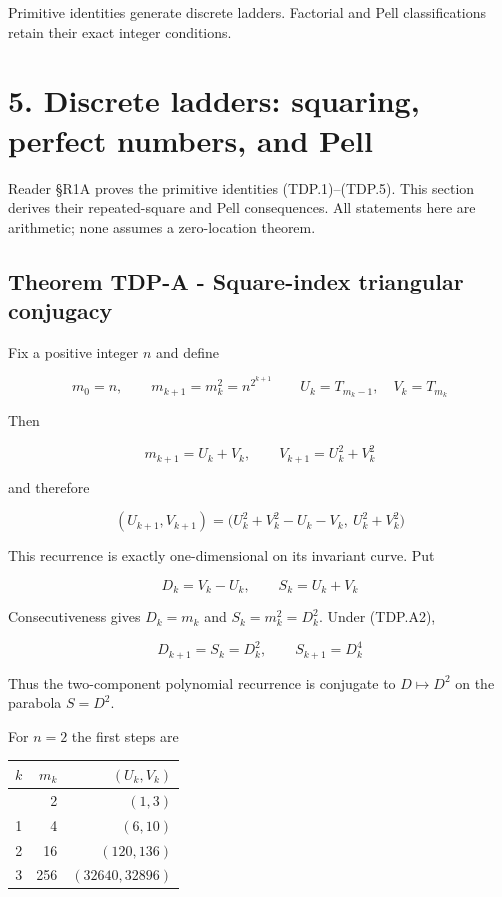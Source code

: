 \documentclass[
  11pt,
]{book}
\begin{document}
Primitive identities generate discrete ladders. Factorial and Pell
classifications retain their exact integer conditions.

\section{5. Discrete ladders: squaring, perfect numbers, and
Pell}\label{discrete-ladders-squaring-perfect-numbers-and-pell}

Reader §R1A proves the primitive identities (TDP.1)--(TDP.5). This
section derives their repeated-square and Pell consequences. All
statements here are arithmetic; none assumes a zero-location theorem.

\subsection{Theorem TDP-A - Square-index triangular
conjugacy}\label{theorem-tdp-a---square-index-triangular-conjugacy}

Fix a positive integer \(n\) and define

\[
m_0=n,\qquad m_{k+1}=m_k^2=n^{2^{k+1}}
\qquad
U_k=T_{m_k-1},\quad V_k=T_{m_k}
\tag{TDP.A1}
\]

Then

\[
m_{k+1}=U_k+V_k,\qquad
V_{k+1}=U_k^2+V_k^2
\]

and therefore

\[
\boxed{
(U_{k+1},V_{k+1})
=\bigl(U_k^2+V_k^2-U_k-V_k,\ U_k^2+V_k^2\bigr)
}
\tag{TDP.A2}
\]

This recurrence is exactly one-dimensional on its invariant curve. Put

\[
D_k=V_k-U_k,\qquad S_k=U_k+V_k
\]

Consecutiveness gives \(D_k=m_k\) and \(S_k=m_k^2=D_k^2\). Under
(TDP.A2),

\[
\boxed{D_{k+1}=S_k=D_k^2,\qquad S_{k+1}=D_k^4}
\tag{TDP.A3}
\]

Thus the two-component polynomial recurrence is conjugate to
\(D\mapsto D^2\) on the parabola \(S=D^2\).

For \(n=2\) the first steps are

\begin{longtable}[]{@{}rrr@{}}
\toprule\noalign{}
\(k\) & \(m_k\) & \((U_k,V_k)\) \\
\midrule\noalign{}
\endhead
\bottomrule\noalign{}
\endlastfoot
0 & 2 & \((1,3)\) \\
1 & 4 & \((6,10)\) \\
2 & 16 & \((120,136)\) \\
3 & 256 & \((32640,32896)\) \\
\end{longtable}
\end{document}
